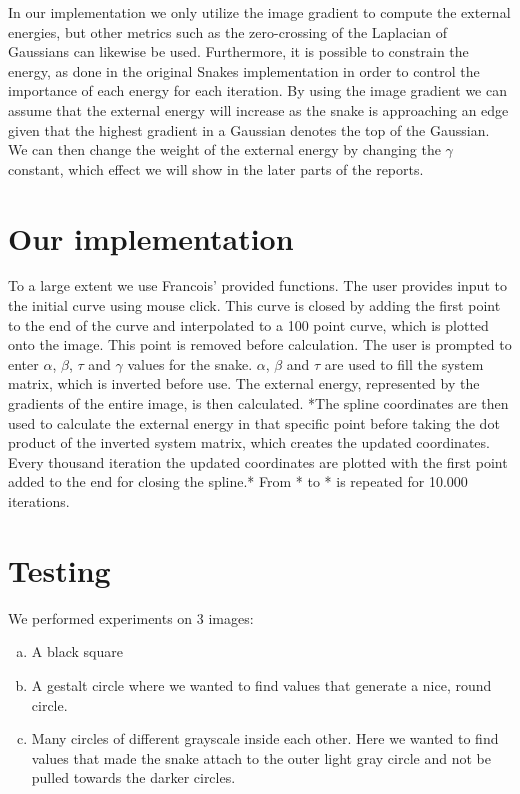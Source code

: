 \documentclass[paper=a4, fontsize=11pt]{scrartcl} %
\numberwithin{equation}{section} %
\numberwithin{figure}{section} %
\numberwithin{table}{section} %
\begin{document}
In our implementation we only utilize the image gradient to compute the external energies, but other metrics such as the zero-crossing of the Laplacian of Gaussians can likewise be used. Furthermore, it is possible to constrain the energy, as done in the original Snakes implementation in order to control the importance of each energy for each iteration. By using the image gradient we can assume that the external energy will increase as the snake is approaching an edge given that the highest gradient in a Gaussian denotes the top of the Gaussian. We can then change the weight of the external energy by changing the $\gamma$ constant, which effect we will show in the later parts of the reports.
\

\section{Our implementation}
To a large extent we use Francois' provided functions. The user provides input to the initial curve using mouse click. This curve is closed by adding the first point to the end of the curve and interpolated to a 100 point curve, which is plotted onto the image. This point is removed before calculation. The user is prompted to enter $\alpha$, $\beta$, $\tau$ and $\gamma$ values for the snake. $\alpha$, $\beta$ and $\tau$ are used to fill the system matrix, which is inverted before use. The external energy, represented by the gradients of the entire image, is then calculated. *The spline coordinates are then used to calculate the external energy in that specific point before taking the dot product of the inverted system matrix, which creates the updated coordinates. Every thousand iteration the updated coordinates are plotted with the first point added to the end for closing the spline.* From * to * is repeated for 10.000 iterations. 
\

\section{Testing}
We performed experiments on 3 images:
\
\begin{enumerate}[(a)]
\item A black square
\item A gestalt circle where we wanted to find values that generate a nice, round circle.
\item Many circles of different grayscale inside each other. Here we wanted to find values that made the snake attach to the outer light gray circle and not be pulled towards the darker circles.
\end{enumerate}
\end{document}
